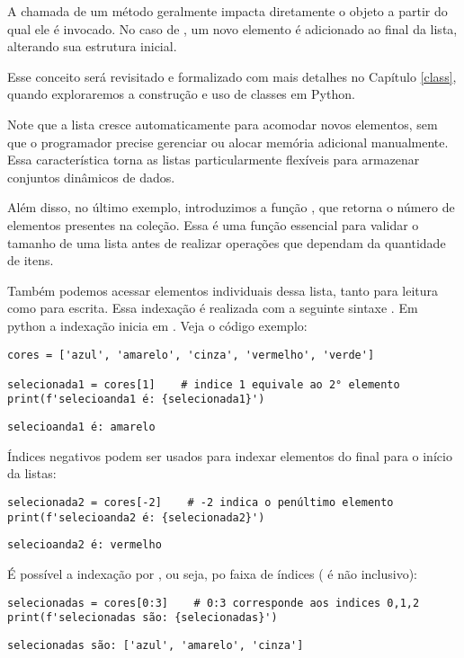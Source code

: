 A chamada de um método geralmente impacta diretamente o objeto a partir do qual ele é invocado.
No caso de , um novo elemento é adicionado ao final da lista, alterando sua estrutura inicial.

Esse conceito será revisitado e formalizado com mais detalhes no Capítulo \ref{class}, quando exploraremos a
construção e uso de classes em Python.

Note que a lista cresce automaticamente para acomodar novos elementos, sem que o programador precise gerenciar ou
alocar memória adicional manualmente.
Essa característica torna as listas particularmente flexíveis para armazenar conjuntos dinâmicos de dados.

Além disso, no último exemplo, introduzimos a função , que retorna o número de elementos presentes na coleção.
Essa é uma função essencial para validar o tamanho de uma lista antes de realizar operações que dependam da quantidade de itens.

Também podemos acessar elementos individuais dessa lista, tanto para leitura como para escrita.
Essa indexação é realizada com a seguinte sintaxe .
Em python a indexação inicia em .
Veja o código exemplo:
\begin{verbatim}
cores = ['azul', 'amarelo', 'cinza', 'vermelho', 'verde']

selecionada1 = cores[1]    # indice 1 equivale ao 2° elemento
print(f'selecioanda1 é: {selecionada1}')
\end{verbatim}
\begin{verbatim}
selecioanda1 é: amarelo
\end{verbatim}

Índices negativos podem ser usados para indexar elementos do final para o início da listas:
\begin{verbatim}
selecionada2 = cores[-2]    # -2 indica o penúltimo elemento
print(f'selecioanda2 é: {selecionada2}')
\end{verbatim}
\begin{verbatim}
selecioanda2 é: vermelho
\end{verbatim}

É possível a indexação por , ou seja, po faixa de índices 
( é não inclusivo):
\begin{verbatim}
selecionadas = cores[0:3]    # 0:3 corresponde aos indices 0,1,2
print(f'selecionadas são: {selecionadas}')
\end{verbatim}
\begin{verbatim}
selecionadas são: ['azul', 'amarelo', 'cinza']
\end{verbatim}

